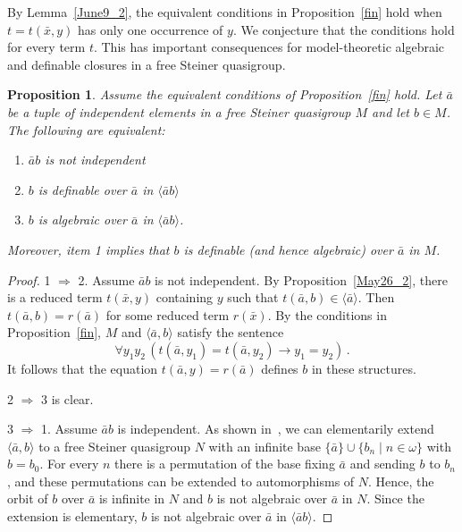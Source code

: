 \documentclass[a4paper, 11pt]{article}
\theoremstyle{note}
\newtheorem{prop}[thm]{Proposition}
\begin{document}
By Lemma~\ref{June9_2}, the equivalent conditions in Proposition~\ref{fin} hold when $t=t(\bar{x},y)$ has only one occurrence of $y$. We conjecture that the conditions hold for every term $t$. This has important consequences for model-theoretic algebraic and definable closures in a free Steiner quasigroup.

\begin{prop}  Assume the equivalent conditions of Proposition~\ref{fin} hold. Let  $\bar{a}$ be a tuple of independent elements in a free Steiner quasigroup $M$  and let $b\in M$. The following are equivalent:
	\begin{enumerate}
		\item $\bar{a}b$ is not independent
		\item $b$ is definable over $\bar{a}$ in $\langle \bar{a}b\rangle$
			\item $b$ is algebraic over $\bar{a}$ in $\langle \bar{a}b\rangle$.
	\end{enumerate}
	Moreover, item 1 implies that $b$ is definable (and hence algebraic) over $\bar{a}$ in $M$.
	\end{prop}
	\begin{proof}
		1 $\Rightarrow$ 2.  Assume $\bar{a}b$ is not independent. By Proposition~\ref{May26_2}, there is a reduced term $t(\bar{x},y)$ containing $y$ such that $t(\bar{a},b)\in\langle \bar{a}\rangle$. Then $t(\bar{a},b) = r(\bar{a})$  for some reduced term $r(\bar{x})$. By the conditions in Proposition~\ref{fin}, $M$  and  $\langle \bar{a},b\rangle$  satisfy the  sentence
		\[\forall y_1y_2 \, \left(t(\bar{a},y_1)= t(\bar{a},y_2)\rightarrow y_1=y_2 \right) \, .\]
It follows that  the equation  $t(\bar{a},y) = r(\bar{a})$ defines $b$ in these structures.
		
		2 $\Rightarrow$ 3  is clear.
		
		3 $\Rightarrow$ 1.  Assume $\bar{a}b$ is independent.  As shown in~\cite{barcas3}, we can elementarily extend $\langle \bar{a},b\rangle $ to a free Steiner quasigroup $N$  with an infinite base  $\{\bar{a}\}\cup\{b_n\mid n\in \omega\}$  with  $b=b_0$.  For every $n$ there is a permutation of the base fixing $\bar{a}$ and sending $b$ to $b_n$, and these permutations can be extended to automorphisms of $N$. Hence, the orbit of $b$ over $\bar{a}$ is infinite in $N$ and $b$ is not algebraic over $\bar{a}$ in $N$. Since the extension is elementary, $b$ is not algebraic over $\bar{a}$ in $\langle \bar{a}b\rangle$.
	\end{proof}
\end{document}
